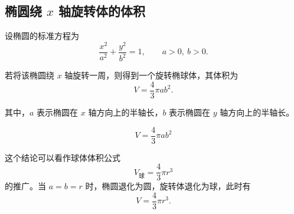 \subsection*{椭圆绕 \(x\) 轴旋转体的体积}

设椭圆的标准方程为
\[
	\frac{x^2}{a^2}+\frac{y^2}{b^2}=1,
	\qquad a>0,\ b>0.
\]

若将该椭圆绕 \(x\) 轴旋转一周，则得到一个旋转椭球体，其体积为
\[
	V=\frac{4}{3}\pi ab^2.
\]

其中，\(a\) 表示椭圆在 \(x\) 轴方向上的半轴长，\(b\) 表示椭圆在 \(y\) 轴方向上的半轴长。

\[
	\boxed{V=\frac{4}{3}\pi ab^2}
\]

这个结论可以看作球体体积公式
\[
	V_{\text{球}}=\frac{4}{3}\pi r^3
\]
的推广。当 \(a=b=r\) 时，椭圆退化为圆，旋转体退化为球，此时有
\[
	V=\frac{4}{3}\pi r^3.
\]